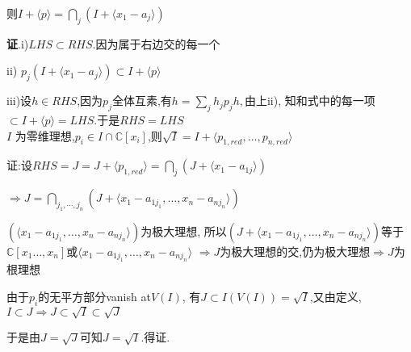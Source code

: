 则$ I+\langle p \rangle = \bigcap\limits_{j}{(I+\langle x_1-a_j \rangle)}$

{\bf 证}.i)$ LHS \subset RHS$.因为属于右边交的每一个

ii) $ p_j(I+\langle x_1-a_j \rangle)\subset I+\langle p \rangle$

iii)设$ h \in RHS$,因为$ p_j$全体互素,有$ h=\sum_{j}{h_jp_jh},$由上ii),
知和式中的每一项$ \subset I+\langle p \rangle=LHS$.于是$ RHS=LHS$
\\

$ I$ 为零维理想,$ p_i \in I \cap \mathbb{C}[x_i]$,则$ \sqrt{I}=I+\langle p_{1,red},\ldots,p_{n,red} \rangle$

证:设$ RHS = J = J+\langle p_{1,red} \rangle = \bigcap\limits_{j}{(J + \langle x_1-a_{1j} \rangle)}$

$ \Rightarrow J =\bigcap\limits_{j_1,\cdots ,j_n}{(J+\langle x_1-a_{1j_1},\ldots,x_n-a_{nj_n} \rangle)}$

$ (\langle x_1-a_{1j_1},\ldots,x_n-a_{nj_n} \rangle)$为极大理想,
所以$(J+\langle x_1-a_{1j_1},\ldots,x_n-a_{nj_n} \rangle) $等于$ \mathbb{C}[x_1\ldots,x_n]$或$ \langle x_1-a_{1j_1},\ldots,x_n-a_{nj_n} \rangle$
$ \Rightarrow J$为极大理想的交,仍为极大理想$ \Rightarrow J$为根理想

由于$ p_i$的无平方部分vanish at$ V(I)$, 有$ J \subset I(V(I)) = \sqrt{I}$,又由定义, $ I\subset J\Rightarrow J\subset \sqrt{I}\subset \sqrt{J}$

于是由$ J= \sqrt{J}$可知$ J = \sqrt{I}$.得证.

